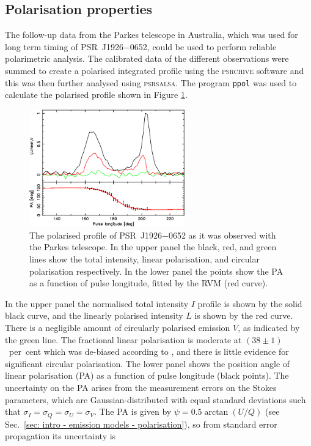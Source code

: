 \subsection{Polarisation properties}
\label{sec: J1926 - analysis - polarisation}

The follow-up data from the Parkes telescope in Australia, which was used for long term timing of PSR~J1926$-$0652, could be used to perform reliable polarimetric analysis. The calibrated data of the different observations were summed to create a polarised integrated profile using the \textsc{psrchive} software \citep{HSMx2004} and this was then further analysed using \textsc{psrsalsa}. The program \texttt{ppol} was used to calculate the polarised profile shown in Figure \ref{fig: J1926 - parkes profile}.
\begin{figure}
    \begin{center}
        \includegraphics[width=0.6\textwidth]{Figures/J1926/parkes_profile}
        \caption[Polarised profile of PSR~J1926$-$0652 observed with Parkes]{The polarised profile of PSR~J1926$-$0652 as it was observed with the Parkes telescope. In the upper panel the black, red, and green lines show the total intensity, linear polarisation, and circular polarisation respectively. In the lower panel the points show the PA as a function of pulse longitude, fitted by the RVM (red curve).}
        \label{fig: J1926 - parkes profile}
    \end{center}
\end{figure}
In the upper panel the normalised total intensity $I$ profile is shown by the solid black curve, and the linearly polarised intensity $L$ is shown by the red curve. There is a negligible amount of circularly polarised emission $V$, as indicated by the green line. The fractional linear polarisation is moderate at $(38\pm1)$~per~cent which was de-biased according to \citet{WKxx1974}, and there is little evidence for significant circular polarisation. The lower panel shows the position angle of linear polarisation (PA) as a function of pulse longitude (black points). The uncertainty on the PA arises from the measurement errors on the Stokes parameters, which are Gaussian-distributed with equal standard deviations such that $\sigma_I = \sigma_Q = \sigma_U = \sigma_V$. The PA is given by $\psi = 0.5\arctan(U/Q)$ (see Sec.~\ref{sec: intro - emission models - polarisation}), so from standard error propagation its uncertainty is
